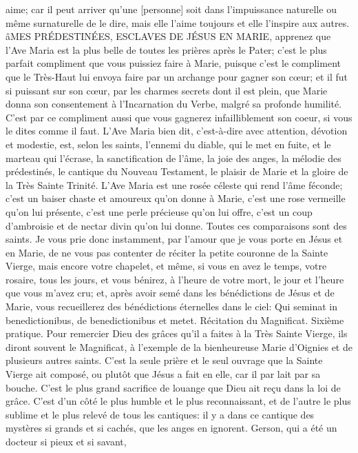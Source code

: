aime; car il peut arriver qu'une [personne] soit dans l'impuissance naturelle ou même surnaturelle de le dire, mais
elle l'aime toujours et elle l'inspire aux autres.
 âMES PRÉDESTINÉES, ESCLAVES DE JÉSUS EN MARIE, apprenez que l'Ave Maria est la plus belle de
toutes les prières après le Pater; c'est le plus parfait compliment que vous puissiez faire à Marie, puisque c'est le
compliment que le Très-Haut lui envoya faire par un archange pour gagner son cœur; et il fut si puissant sur son
cœur, par les charmes secrets dont il est plein, que Marie donna son consentement à l'Incarnation du Verbe,
malgré sa profonde humilité. C'est par ce compliment aussi que vous gagnerez infailliblement son coeur, si vous le
dites comme il faut.
 L'Ave Maria bien dit, c'est-à-dire avec attention, dévotion et modestie, est, selon les saints, l'ennemi du
diable, qui le met en fuite, et le marteau qui l'écrase, la sanctification de l'âme, la joie des anges, la mélodie des
prédestinés, le cantique du Nouveau Testament, le plaisir de Marie et la gloire de la Très Sainte Trinité. L'Ave
Maria est une rosée céleste qui rend l'âme féconde; c'est un baiser chaste et amoureux qu'on donne à Marie, c'est
une rose vermeille qu'on lui présente, c'est une perle précieuse qu'on lui offre, c'est un coup d'ambroisie et de
nectar divin qu'on lui donne. Toutes ces comparaisons sont des saints.
 Je vous prie donc instamment, par l'amour que je vous porte en Jésus et en Marie, de ne vous pas contenter
de réciter la petite couronne de la Sainte Vierge, mais encore votre chapelet, et même, si vous en avez le temps,
votre rosaire, tous les jours, et vous bénirez, à l'heure de votre mort, le jour et l'heure que vous m'avez cru; et,
après avoir semé dans les bénédictions de Jésus et de Marie, vous recueillerez des bénédictions éternelles dans
le ciel: Qui seminat in benedictionibus, de benedictionibus et metet.
Récitation du Magnificat.
 Sixième pratique. Pour remercier Dieu des grâces qu'il a faites à la Très Sainte Vierge, ils diront souvent le
Magnificat, à l'exemple de la bienheureuse Marie d'Oignies et de plusieurs autres saints. C'est la seule prière et le
seul ouvrage que la Sainte Vierge ait composé, ou plutôt que Jésus a fait en elle, car il par lait par sa bouche.
C'est le plus grand sacrifice de louange que Dieu ait reçu dans la loi de grâce. C'est d'un côté le plus humble et le
plus reconnaissant, et de l'autre le plus sublime et le plus relevé de tous les cantiques: il y a dans ce cantique des
mystères si grands et si cachés, que les anges en ignorent. Gerson, qui a été un docteur si pieux et si savant,
